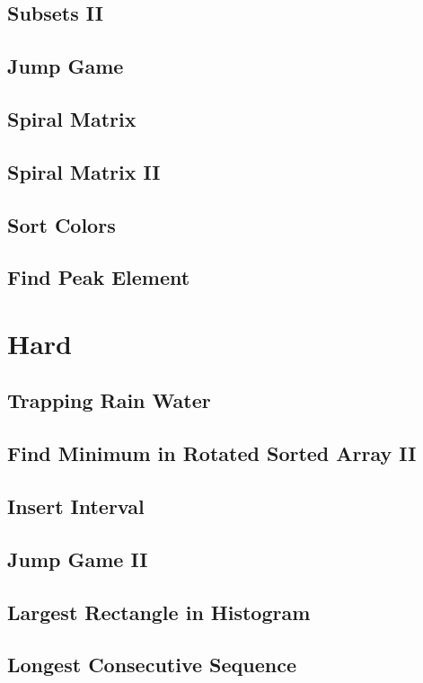 \documentclass[11pt]{book}
\begin{document}
\subsection{Subsets II}
\label{sec-1-2-29}
\subsection{Jump Game}
\label{sec-1-2-30}
\subsection{Spiral Matrix}
\label{sec-1-2-31}
\subsection{Spiral Matrix II}
\label{sec-1-2-32}
\subsection{Sort Colors}
\label{sec-1-2-33}
\subsection{Find Peak Element}
\label{sec-1-2-34}
\section{Hard}
\label{sec-1-3}
\subsection{Trapping Rain Water}
\label{sec-1-3-1}
\subsection{Find Minimum in Rotated Sorted Array II}
\label{sec-1-3-2}
\subsection{Insert Interval}
\label{sec-1-3-3}
\subsection{Jump Game II}
\label{sec-1-3-4}
\subsection{Largest Rectangle in Histogram}
\label{sec-1-3-5}
\subsection{Longest Consecutive Sequence}
\label{sec-1-3-6}
\end{document}
